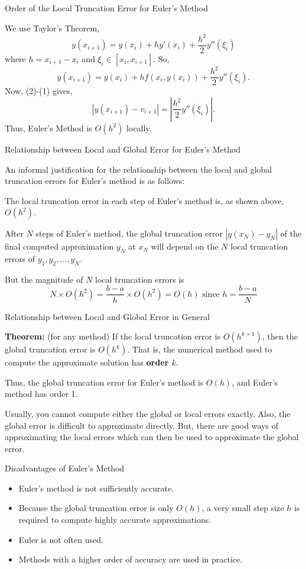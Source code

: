 \documentclass[12pt]{beamer}
\begin{document}
\begin{frame}{Order of the Local Truncation Error for Euler's Method}

We use Taylor's Theorem,
\[
y(x_{i+1})=y(x_i)+hy'(x_i)+\frac{h^2}{2}y''(\xi_i)
\]
where $h=x_{i+1}-x_i$ and $\xi_i \in [x_i,x_{i+1}]$. So,
\begin{equation}
y(x_{i+1})=y(x_i)+hf(x_i,y(x_i))+\frac{h^2}{2}y''(\xi_i).
\end{equation}
Now, (2)-(1) gives,
\[
|y(x_{i+1})-v_{i+1}|=\left |\frac{h^2}{2}y''(\xi_i) \right |.
\]
Thus, Euler's Method is $O(h^2)$ locally.

\end{frame}

\begin{frame}{Relationship between Local and Global Error for Euler's Method}

An informal justification for the relationship between the local and global truncation errors for Euler's method is as follows:

The local truncation error in each step of Euler's method is, as shown above, $O(h^2)$.

After $N$ steps of Euler's method, the global truncation error $|y(x_N)-y_N|$ of the final computed approximation $y_N$ at $x_N$ will depend on the $N$ local truncation errors of $y_1,y_2,...,y_N$.

But the magnitude of $N$ local truncation errors is 
\[
N \times O(h^2)=\frac{b-a}{h} \times O(h^2) = O(h) \text{ since } h = \frac{b-a}{N}
\]

\end{frame}

\begin{frame}{Relationship between Local and Global Error in General}

{\bf Theorem:} (for any method)
If the local truncation error is $O(h^{k+1})$, then the global truncation error is $O(h^k)$. That is, the numerical method used to compute the approximate solution has {\bf order $k$}.  

Thus, the global truncation error for Euler’s method is $O(h)$, and Euler’s method has order 1.

Usually, you cannot compute either the global or local errors exactly. Also, the global error is difficult to approximate directly. But, there are good ways of approximating the local errors which can then be used to approximate the global error.

\end{frame}

\begin{frame}{Disadvantages of Euler's Method}
\begin{itemize}
\item{Euler's method is not sufficiently accurate.}
\item{Because the global truncation error is only $O(h)$, a very small step size $h$ is required to compute highly accurate approximations.}
\item{Euler is not often used.}
\item{Methods with a higher order of accuracy are used in practice.}
\end{itemize}
\end{frame}
\end{document}
